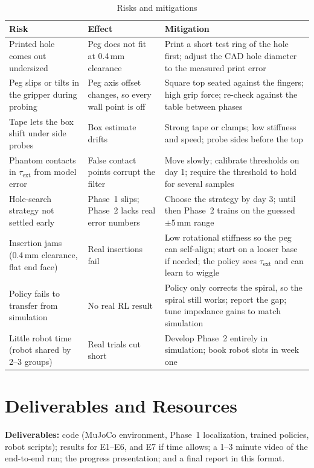 \documentclass[conference]{IEEEtran}
\newcommand{\tauext}{\tau_{\mathrm{ext}}}
\begin{document}
\begin{table}[t]
\caption{Risks and mitigations}
\label{tab:risks}
\centering
\footnotesize
\begin{tabularx}{\textwidth}{@{}>{\raggedright\arraybackslash}p{4.4cm}>{\raggedright\arraybackslash}p{4.2cm}L@{}}
\toprule
Risk & Effect & Mitigation \\
\midrule
Printed hole comes out undersized & Peg does not fit at 0.4\,mm clearance & Print a short test ring of the hole first; adjust the CAD hole diameter to the measured print error \\
Peg slips or tilts in the gripper during probing & Peg axis offset changes, so every wall point is off & Square top seated against the fingers; high grip force; re-check against the table between phases \\
Tape lets the box shift under side probes & Box estimate drifts & Strong tape or clamps; low stiffness and speed; probe sides before the top \\
Phantom contacts in $\tauext$ from model error & False contact points corrupt the filter & Move slowly; calibrate thresholds on day 1; require the threshold to hold for several samples \\
Hole-search strategy not settled early & Phase~1 slips; Phase~2 lacks real error numbers & Choose the strategy by day 3; until then Phase~2 trains on the guessed $\pm5$\,mm range \\
Insertion jams (0.4\,mm clearance, flat end face) & Real insertions fail & Low rotational stiffness so the peg can self-align; start on a looser base if needed; the policy sees $\tauext$ and can learn to wiggle \\
Policy fails to transfer from simulation & No real RL result & Policy only corrects the spiral, so the spiral still works; report the gap; tune impedance gains to match simulation \\
Little robot time (robot shared by 2--3 groups) & Real trials cut short & Develop Phase~2 entirely in simulation; book robot slots in week one \\
\bottomrule
\end{tabularx}
\end{table}

\section{Deliverables and Resources}

\textbf{Deliverables:} code (MuJoCo environment, Phase~1 localization, trained
policies, robot scripts); results for E1--E6, and E7 if time allows; a 1--3
minute video of the end-to-end run; the progress presentation; and a final
report in this format.
\end{document}
